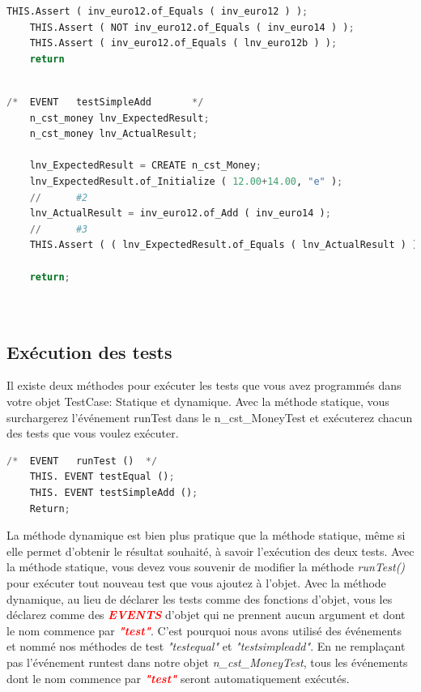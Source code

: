 \documentclass[french]{article}
\theoremstyle{definition}
\begin{document}
\begin{itemize}
\begin{lstlisting}[language=Python, caption=Test d'egalité sans la logique du d'initialisation]
    THIS.Assert ( inv_euro12.of_Equals ( inv_euro12 ) );
    THIS.Assert ( NOT inv_euro12.of_Equals ( inv_euro14 ) );
    THIS.Assert ( inv_euro12.of_Equals ( lnv_euro12b ) );
    return
    
\end{lstlisting}


\begin{lstlisting}[language=Python, caption=Test d'ajout simple sans la logique du d'initialisation]
    /*	EVENT	testSimpleAdd		*/
    n_cst_money	lnv_ExpectedResult;
    n_cst_money	lnv_ActualResult;
    
    lnv_ExpectedResult = CREATE n_cst_Money;
    lnv_ExpectedResult.of_Initialize ( 12.00+14.00, "e" );
    //		#2
    lnv_ActualResult = inv_euro12.of_Add ( inv_euro14 );
    //		#3
    THIS.Assert ( ( lnv_ExpectedResult.of_Equals ( lnv_ActualResult ) ) );
    
    return;
    
    
\end{lstlisting}

\end{itemize}
\subsection{Exécution des tests}
Il existe deux méthodes pour exécuter les tests que vous avez programmés dans votre objet TestCase:  Statique et dynamique.
 Avec la méthode statique, vous surchargerez l'événement runTest dans le n\_cst\_MoneyTest et exécuterez chacun des tests que vous voulez exécuter.


\begin{lstlisting}[language=Python, caption= Redefinition de l'evènement \textit{runTest}]
    /*	EVENT	runTest ()	*/
    THIS. EVENT testEqual ();
    THIS. EVENT testSimpleAdd ();
    Return;
\end{lstlisting}
La méthode dynamique est bien plus pratique que la méthode statique, même si elle permet d'obtenir le résultat souhaité, à savoir l'exécution des deux tests. 
 Avec la méthode statique, vous devez vous souvenir de modifier la méthode \textit{runTest()} pour exécuter tout nouveau test que vous ajoutez à l'objet.
 Avec la méthode dynamique, au lieu de déclarer les tests comme des fonctions d'objet, vous les déclarez comme des \textbf{\textit{\textcolor{red}{EVENTS}}} d'objet qui ne prennent aucun argument et dont le nom commence par \textbf{\textit{\textcolor{red}{"test"}}}.
 C'est pourquoi nous avons utilisé des événements et nommé nos méthodes de test \textit{"testequal"} et \textit{"testsimpleadd"}.
   En ne remplaçant pas l'événement runtest dans notre objet \textit{n\_cst\_MoneyTest}, tous les événements dont le nom commence par  \textbf{\textit{\textcolor{red}{"test"}}} seront automatiquement exécutés.
\end{document}
